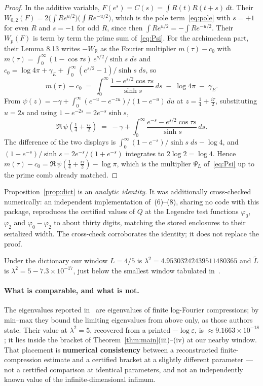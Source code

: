 \documentclass[11pt,a4paper]{article}
\theoremstyle{definition}
\theoremstyle{remark}
\newcommand{\PsiL}{\Psi_{L}}
\begin{document}
\begin{proof}
In the additive variable, $F(e^s) = C(s) = \int R(t)R(t+s)\,dt$. Their
$W_{0,2}(F) = 2\big(\int R e^{u/2}\big)\big(\int R e^{-u/2}\big)$, which is the
pole term~\eqref{eq:pole} with $s = +1$ for even $R$ and $s = -1$ for odd $R$,
since then $\int R e^{u/2} = -\int R e^{-u/2}$. Their $W_p(F)$ is term by term
the prime sum of~\eqref{eq:Psi}. For the archimedean part, their Lemma 8.13
writes $-W_{\mathbb{R}}$ as the Fourier multiplier $m(\tau) - c_0$ with
$m(\tau) = \int_0^\infty (1-\cos\tau s)\,e^{s/2}/\sinh s\;ds$ and
$c_0 = \log 4\pi + \gamma_E + \int_0^\infty (e^{s/2}-1)/\sinh s\;ds$, so
\[
   m(\tau) - c_0 \;=\; \int_0^\infty \frac{1 - e^{s/2}\cos\tau s}{\sinh s}\,ds
   \;-\; \log 4\pi \;-\; \gamma_E .
\]
From $\psi(z) = -\gamma + \int_0^\infty (e^{-u}-e^{-zu})/(1-e^{-u})\,du$ at
$z = \tfrac14 + \tfrac{i\tau}{2}$, substituting $u = 2s$ and using
$1 - e^{-2s} = 2e^{-s}\sinh s$,
\[
   \Re\,\psi\!\left(\tfrac14 + \tfrac{i\tau}{2}\right)
   \;=\; -\gamma + \int_0^\infty \frac{e^{-s} - e^{s/2}\cos\tau s}{\sinh s}\,ds .
\]
The difference of the two displays is
$\int_0^\infty (1-e^{-s})/\sinh s\;ds - \log 4$, and
$(1-e^{-s})/\sinh s = 2e^{-s}/(1+e^{-s})$ integrates to $2\log 2 = \log 4$.
Hence $m(\tau) - c_0 = \Re\,\psi(\tfrac14+\tfrac{i\tau}{2}) - \log\pi$, which is
the multiplier $\PsiL$ of~\eqref{eq:Psi} up to the prime comb already matched.
\end{proof}

Proposition~\ref{prop:dict} is an \emph{analytic identity}. It was additionally
cross-checked numerically: an independent implementation of~(6)--(8), sharing no
code with this package, reproduces the certified values of $Q$ at the Legendre
test functions $\varphi_0$, $\varphi_2$ and $\varphi_0 - \varphi_2$ to about
thirty digits, matching the stored enclosures to their serialized width. The
cross-check corroborates the identity; it does not replace the proof.

Under the dictionary our window $L = 4/5$ is $\lambda^2 = 4.95303242439511480365$
and $\widetilde L$ is $\lambda^2 = 5 - 7.3\times10^{-17}$, just below the
smallest window tabulated in~\cite{ACLG}.

\paragraph{What is comparable, and what is not.}
The eigenvalues reported in~\cite[\S4]{ACLG} are eigenvalues of finite
log-Fourier compressions; by min--max they bound the limiting eigenvalues from
above only, as those authors state. Their value at $\lambda^2 = 5$, recovered
from a printed $-\log\varepsilon$, is $\approx 9.1663\times10^{-18}$; it lies
inside the bracket of Theorem~\ref{thm:main}(iii)--(iv) at our nearby window.
That placement is \textbf{numerical consistency} between a reconstructed
finite-compression estimate and a certified bracket at a slightly different
parameter --- not a certified comparison at identical parameters, and not an
independently known value of the infinite-dimensional infimum.
\end{document}
